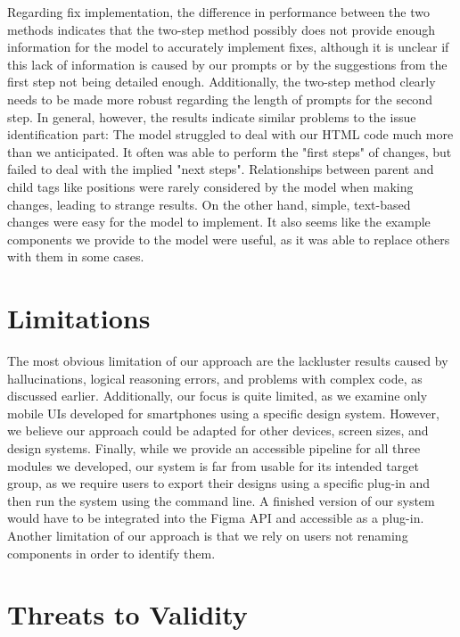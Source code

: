 \documentclass[11pt,titlepage,oneside,openany]{book}
\begin{document}
Regarding fix implementation, the difference in performance between the two methods indicates that the two-step method possibly does not provide enough information for the model to accurately implement fixes, although it is unclear if this lack of information is caused by our prompts or by the suggestions from the first step not being detailed enough. Additionally, the two-step method clearly needs to be made more robust regarding the length of prompts for the second step. In general, however, the results indicate similar problems to the issue identification part: The model struggled to deal with our HTML code much more than we anticipated. It often was able to perform the "first steps" of changes, but failed to deal with the implied "next steps". Relationships between parent and child tags like positions were rarely considered by the model when making changes, leading to strange results. On the other hand, simple, text-based changes were easy for the model to implement. It also seems like the example components we provide to the model were useful, as it was able to replace others with them in some cases.

\section{Limitations}\label{sec:lim}

The most obvious limitation of our approach are the lackluster results caused by hallucinations, logical reasoning errors, and problems with complex code, as discussed earlier. Additionally, our focus is quite limited, as we examine only mobile UIs developed for smartphones using a specific design system. However, we believe our approach could be adapted for other devices, screen sizes, and design systems. Finally, while we provide an accessible pipeline for all three modules we developed, our system is far from usable for its intended target group, as we require users to export their designs using a specific plug-in and then run the system using the command line. A finished version of our system would have to be integrated into the Figma API and accessible as a plug-in. Another limitation of our approach is that we rely on users not renaming components in order to identify them.

\section{Threats to Validity}\label{sec:threat}
\end{document}
